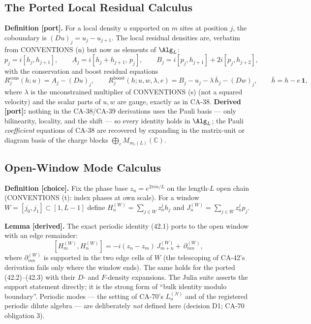 \subsection{The Ported Local Residual Calculus}

\textbf{Definition [port].}  For a local density \(u\) supported on \(m\)
sites at position \(j\), the coboundary is \((Du)_j=u_j-u_{j+1}\).  The
local residual densities are, verbatim from CONVENTIONS (n) but now as
elements of \(\Alg_L\):
\[
  p_j=i[h_j,h_{j+1}],\qquad
  A_j=i[h_j+h_{j+1},\,p_j],\qquad
  B_j=i[p_j,h_{j+1}]+2i[p_j,h_{j+2}],
\]
with the conservation and boost residual equations
\[
  R^{\mathrm{cons}}_j(h;u)=A_j-(Du)_j,
  \qquad
  R^{\mathrm{boost}}_j(h;u,w,\lambda,e)
  =B_j-u_j-\lambda\,\bar h_j-(Dw)_j,
  \qquad \bar h=h-e\,\mathbf 1,
\]
where \(\lambda\) is the unconstrained multiplier of CONVENTIONS (s) (not a
squared velocity) and the scalar parts of \(u,w\) are gauge, exactly as in
CA-38.  \textbf{Derived [port]:} nothing in the CA-38/CA-39 derivations
uses the Pauli basis --- only bilinearity, locality, and the shift --- so
every identity holds in \(\Alg_L\); the Pauli \emph{coefficient} equations
of CA-38 are recovered by expanding in the matrix-unit or diagram basis of
the charge blocks \(\bigoplus_cM_{m_c(L)}(\mathbb C)\).

\subsection{Open-Window Mode Calculus}

\textbf{Definition [choice].}  Fix the phase base \(z_n=e^{2\pi in/L}\) on
the length-\(L\) open chain (CONVENTIONS (t): index phases at own scale).
For a window \(W=[j_0,j_1]\subset[1,L-1]\) define
\(H_n^{(W)}=\sum_{j\in W}z_n^jh_j\) and
\(J_n^{(W)}=\sum_{j\in W}z_n^jp_j\).

\textbf{Lemma [derived].}  The exact periodic identity (42.1) ports to the
open window with an edge remainder:
\[
  [H_m^{(W)},H_n^{(W)}]=-i(z_n-z_m)\,J_{m+n}^{(W)}
  +\,\partial_{mn}^{(W)},
\]
where \(\partial_{mn}^{(W)}\) is supported in the two edge cells of \(W\)
(the telescoping of CA-42's derivation fails only where the window ends).
The same holds for the ported (42.2)--(42.3) with their \(D\)- and
\(F\)-density expansions.  The Julia suite asserts the support statement
directly; it is the strong form of ``bulk identity modulo boundary''.
Periodic modes --- the setting of CA-70's \(L_n^{(N)}\) and of the
registered periodic dilute algebra --- are deliberately \emph{not} defined
here (decision D1; CA-70 obligation 3).

